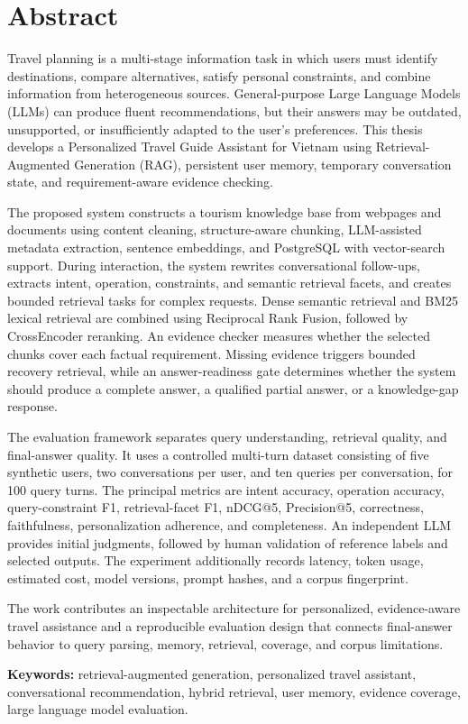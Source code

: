 \chapter*{Abstract}

Travel planning is a multi-stage information task in which users must identify
destinations, compare alternatives, satisfy personal constraints, and combine
information from heterogeneous sources. General-purpose Large Language Models
(LLMs) can produce fluent recommendations, but their answers may be outdated,
unsupported, or insufficiently adapted to the user's preferences. This thesis
develops a Personalized Travel Guide Assistant for Vietnam using
Retrieval-Augmented Generation (RAG), persistent user memory, temporary
conversation state, and requirement-aware evidence checking.

The proposed system constructs a tourism knowledge base from webpages and
documents using content cleaning, structure-aware chunking, LLM-assisted
metadata extraction, sentence embeddings, and PostgreSQL with vector-search
support. During interaction, the system rewrites conversational follow-ups,
extracts intent, operation, constraints, and semantic retrieval facets, and
creates bounded retrieval tasks for complex requests. Dense semantic retrieval
and BM25 lexical retrieval are combined using Reciprocal Rank Fusion, followed
by CrossEncoder reranking. An evidence checker measures whether the selected
chunks cover each factual requirement. Missing evidence triggers bounded
recovery retrieval, while an answer-readiness gate determines whether the
system should produce a complete answer, a qualified partial answer, or a
knowledge-gap response.

The evaluation framework separates query understanding, retrieval quality, and
final-answer quality. It uses a controlled multi-turn dataset consisting of five
synthetic users, two conversations per user, and ten queries per conversation,
for 100 query turns. The principal metrics are intent accuracy, operation
accuracy, query-constraint F1, retrieval-facet F1, nDCG@5, Precision@5,
correctness, faithfulness, personalization adherence, and completeness. An
independent LLM provides initial judgments, followed by human validation of
reference labels and selected outputs. The experiment additionally records
latency, token usage, estimated cost, model versions, prompt hashes, and a
corpus fingerprint.

The work contributes an inspectable architecture for personalized,
evidence-aware travel assistance and a reproducible evaluation design that
connects final-answer behavior to query parsing, memory, retrieval, coverage,
and corpus limitations.

\textbf{Keywords:} retrieval-augmented generation, personalized travel
assistant, conversational recommendation, hybrid retrieval, user memory,
evidence coverage, large language model evaluation.

